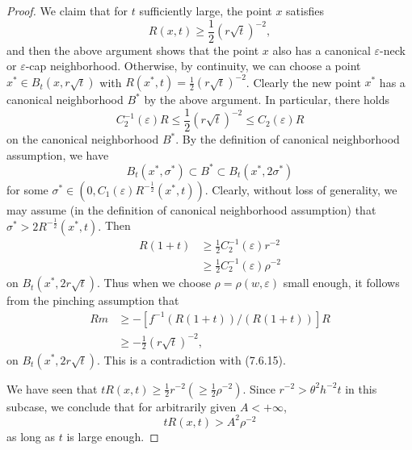 \begin{proof}
We claim that for $t$ sufficiently large, the point $x$ satisfies
$$
R(x,t)\geq \frac{1}{2}(r\sqrt{t})^{-2},
$$
and then the above argument shows that the point $x$ also has a
canonical $\varepsilon$-neck or $\varepsilon$-cap neighborhood.
Otherwise, by continuity, we can choose a point $x^*\in
B_t(x,r\sqrt{t})$ with $R(x^*,t)=\frac{1}{2}(r\sqrt{t})^{-2}$.
Clearly the new point $x^*$ has a canonical neighborhood $B^*$ by
the above argument. In particular, there holds
$$
C^{-1}_2(\varepsilon)R \leq  \frac{1}{2}(r\sqrt{t})^{-2} \leq
C_2(\varepsilon)R
$$
on the canonical neighborhood $B^*$. By the definition of
canonical neighborhood assumption, we have
$$
B_t(x^*,\sigma^*)\subset B^* \subset B_t(x^*,2\sigma^*)
$$
for some $\sigma^* \in
(0,C_1(\varepsilon)R^{-\frac{1}{2}}(x^*,t))$. Clearly, without
loss of generality, we may assume (in the definition of canonical
neighborhood assumption) that $\sigma^* >
2R^{-\frac{1}{2}}(x^*,t).$ Then
\begin{align*}
R(1+t) &  \geq\frac{1}{2}C^{-1}_2(\varepsilon)r^{-2}\\
&  \geq \frac{1}{2}C^{-1}_2(\varepsilon)\rho^{-2}
\end{align*}
on $B_t(x^*,2r\sqrt{t}).$ Thus when we choose
$\rho=\rho(w,\varepsilon)$ small enough, it follows from the
pinching assumption that
\begin{align*}
Rm&  \geq-[f^{-1}(R(1+t))/(R(1+t))]R\\
&  \geq -\frac{1}{2}(r\sqrt{t})^{-2},
\end{align*}
on $B_t(x^*,2r\sqrt{t}).$ This is a contradiction with (7.6.15).

We have seen that $tR(x,t)\geq \frac{1}{2}r^{-2} (\geq
\frac{1}{2}\rho^{-2})$. Since $r^{-2}
> \theta^2 h^{-2} t$ in this subcase, we conclude that for
arbitrarily given $A<+\infty$, \begin{equation}
tR(x,t)>A^2\rho^{-2} %
\end{equation} as long as $t$ is large enough.


\end{proof}
